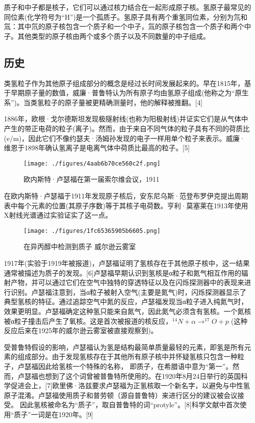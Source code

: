 质子和中子都是核子，它们可以通过核力结合在一起形成原子核。氢原子最常见的同位素(化学符号为“H”)是一个孤质子。氢原子具有两个重氢同位素，分别为氘和氚：其中氘的原子核包含一个质子和一个中子，氚的原子核包含一个质子和两个中子。其他类型的原子核由两个或多个质子以及不同数量的中子组成。

\subsection{历史}
类氢粒子作为其他原子组成部分的概念是经过长时间发展起来的。早在1815年，基于早期原子量的数值，威廉·普鲁特认为所有原子均由氢原子组成(他称之为“原生系”)。当类氢粒子的原子量被更精确测量时，他的解释被推翻。[4]

1886年，欧根·戈尔德斯坦发现极隧射线(也称为阳极射线)并证实它们是从气体中产生的带正电荷的粒子(离子)。然而，由于来自不同气体的粒子具有不同的荷质比(e/m)，因此它们不像约瑟夫·汤姆孙发现的电子一样用单个粒子来表示。威廉·维恩于1898年确认氢离子是电离气体中荷质比最高的粒子。[5]
\begin{figure}[ht]
\centering
\texttt{[image: ./figures/4aab6b70ce560c2f.png]}
\caption{欧内斯特·卢瑟福在第一届索尔维会议，1911} \label{fig_Proton_4}
\end{figure}
在欧内斯特·卢瑟福于1911年发现原子核后，安东尼乌斯·范登布罗伊克提出周期表中每个元素的位置(其原子序数)等于其核子电荷数。亨利·莫塞莱在1913年使用X射线光谱通过实验证实了这一点。
\begin{figure}[ht]
\centering
\texttt{[image: ./figures/1fc65365905b6605.png]}
\caption{在异丙醇中检测到质子 威尔逊云雾室} \label{fig_Proton_5}
\end{figure}
1917年(实验于1919年被报道)，卢瑟福证明了氢核存在于其他原子核中，这一结果通常被描述为质子的发现。[6]卢瑟福早期认识到氢核是α粒子和氮气相互作用的辐射产物，并可以通过它们在空气中独特的穿透特征以及在闪烁探测器中的表现来进行识别。卢瑟福注意到，当α粒子被射入空气(主要是氮气)时，闪烁探测器显示了典型氢核的特征。通过追踪空气中氮的反应，卢瑟福发现当α粒子进入纯氮气时，效果更明显。卢瑟福确定这种氢只能来自氮气，因此氮气必须含有氢核。一个氮核被α粒子撞击后产生了氧核。这是首次被报道的核反应，$^{14}N + \alpha \to ^{17}O + p$ (这种反应后来在1925年的威尔逊云雾室被直接观察到)。

受普鲁特假设的影响，卢瑟福认为氢是结构最简单质量最轻的元素，即氢是所有元素的组成部分。由于发现氢核存在于其他所有原子核中并怀疑氢核只包含一种粒子，卢瑟福因此给氢核一个特殊的名称， 即质子，在希腊语中意为“第一”。然而，卢瑟福也想到了这个词曾被普鲁特所使用的。在1920年8月24日举行的英国科学促进会上，[7]欧里佛·洛兹要求卢瑟福为正氢核取一个新名字，以避免与中性氢原子混淆。卢瑟福使用质子和普劳顿（源自普鲁特）来进行区分的建议被会议接受。 因此氢核被命名为“质子”，取自普鲁特的词“protyle”。[8]科学文献中首次使用“质子”一词是在1920年。[9]

